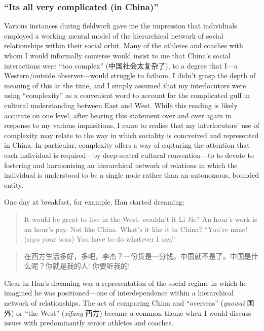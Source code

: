 \begin{CJK}{UTF8}{gbsn}
\subsubsection{``Its all very complicated (in China)''}

Various instances during fieldwork gave me the impression that individuals employed a working mental model of the hierarchical network of social relationships within their social orbit.  Many of the athletes and coaches with whom I would informally converse would insist to me that China's social interactions were ``too complex'' (中国社会太复杂了), to a degree that I---a Western/outside observer---would struggle to fathom. I didn't grasp the depth of meaning of this at the time, and I simply assumed that my interlocutors were using ``complexity'' as a convenient word to account for the complicated gulf in cultural understanding between East and West.  While this reading is likely accurate on one level, after hearing this statement over and over again in response to my various inquisitions, I came to realise that my interlocutors' use of complexity may relate to the way in which sociality is concveived and represented in China.  In particular, complexity offers a way of capturing the attention that each individual is required---by deep-seated cultural convention---to to devote to fostering and harmonising an hierarchical network of relations in which the individual is understood to be a single node rather than an autonomous, bounded entity.

One day at breakfast, for example, Han started dreaming:

\begin{quotation}
  It would be great to live in the West, wouldn’t it Li Jie?  An hour’s work is an hour’s pay.  Not like China.  What’s it like it in China? ``You’re mine! (says your boss) You have to do whatever I say.''
\end{quotation}

\begin{quotation}
  在西方生活多好，多吧，李杰？一份货是一分钱。中国就不是了。中国是什么呢？你就是我的人! 你要听我的!
\end{quotation}

Clear in Han's dreaming was a representation of the social regime in which he imagined he was positioned---one of interdependence within a hierarchical network of relationships.  The act of comparing China and ``overseas'' (\textit{guowai} 国外) or ``the West'' (\textit{xifang} 西方) became a common theme when I would discuss issues with predominantly senior athletes and coaches.


\end{CJK}

